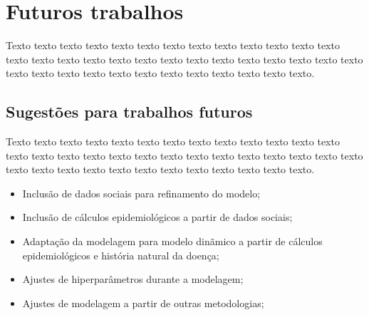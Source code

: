\chapter{Futuros trabalhos}

Texto texto texto texto texto texto texto texto texto texto texto texto texto texto texto texto texto texto texto texto texto texto texto texto texto texto texto texto texto texto texto texto texto texto texto texto texto texto texto.

\section{Sugestões para trabalhos futuros}

Texto texto texto texto texto texto texto texto texto texto texto texto texto texto texto texto texto texto texto texto texto texto texto texto texto texto texto texto texto texto texto texto texto texto texto texto texto texto texto.

\begin{itemize}
    \item Inclusão de dados sociais para refinamento do modelo;
    \item Inclusão de cálculos epidemiológicos a partir de dados sociais;
    \item Adaptação da modelagem para modelo dinãmico a partir de cálculos epidemiológicos e história natural da doença;
    \item Ajustes de hiperparâmetros durante a modelagem;
    \item Ajustes de modelagem a partir de outras metodologias;
\end{itemize}
